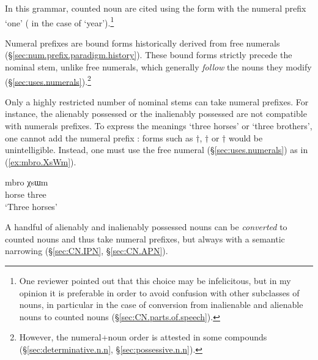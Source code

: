 In this grammar, counted noun are cited using the form with the numeral prefix `one' ( in the case of `year').\footnote{One reviewer pointed out that this choice may be infelicitous, but in my opinion it is preferable in order to avoid confusion with other subclasses of nouns, in particular in the case of conversion from inalienable and alienable nouns to counted nouns (§\ref{sec:CN.parts.of.speech}). }

Numeral prefixes are bound forms historically derived from free numerals (§\ref{sec:num.prefix.paradigm.history}). These bound forms strictly precede the nominal stem, unlike free numerals, which generally \textit{follow} the nouns they modify  (§\ref{sec:uses.numerals}).\footnote{However, the numeral+noun order is attested in some compounds (§\ref{sec:determinative.n.n}, §\ref{sec:possessive.n.n}). }

Only a highly restricted number of nominal stems can take numeral prefixes. For instance, the alienably possessed  or the inalienably possessed  are not compatible with numerals prefixes. To express the meanings `three horses' or `three brothers', one cannot add the numeral prefix : forms such as $\dagger$, $\dagger$ or $\dagger$ would be unintelligible. Instead, one must use the free numeral  (§\ref{sec:uses.numerals}) as in (\ref{ex:mbro.XsWm}).

\begin{exe}
\ex \label{ex:mbro.XsWm}
\gll mbro χsɯm \\
horse three \\
\glt `Three horses'
\end{exe}

A handful of alienably and inalienably possessed nouns can be \textit{converted} to counted nouns and thus take numeral prefixes, but always with a semantic narrowing (§\ref{sec:CN.IPN}, §\ref{sec:CN.APN}).

